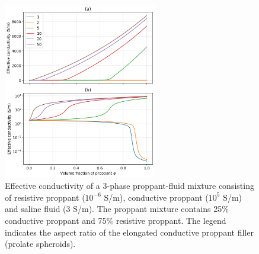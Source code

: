 \begin{figure}
    \begin{center}
    \includegraphics[width=0.6\textwidth]{figures/phys_prop_model/emt_3phase_aspect.png}
    \end{center}
\caption{
    Effective conductivity of a 3-phase proppant-fluid mixture consisting of
    resistive proppant ($10^{-6}$ S/m), conductive proppant ($10^5$ S/m) and saline
    fluid (3 S/m). The proppant mixture contains 25\% conductive proppant and
    75\% resistive proppant. The legend indicates the aspect ratio of the elongated
    conductive proppant filler (prolate spheroids).
}
\label{fig:emt_3phase_aspect}
\end{figure}
